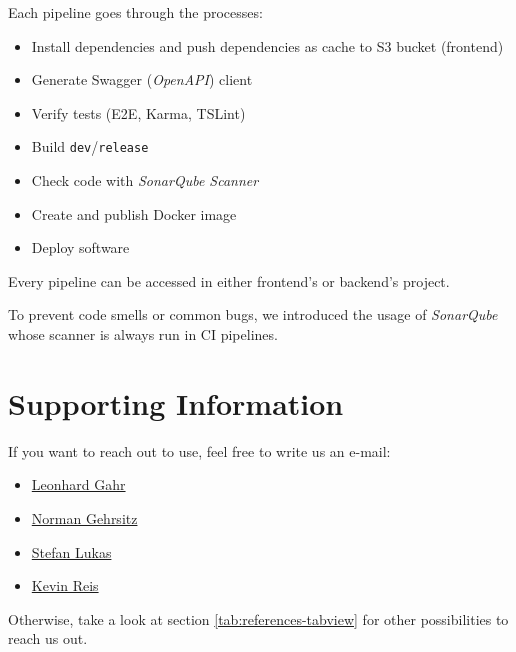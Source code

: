 \documentclass[a4paper,12pt,chapterprefix=false,bibliography=totoc,listof=totoc,]{scrreprt}
\begin{document}
Each pipeline goes through the processes:
\begin{itemize}
	\item Install dependencies and push dependencies as cache to S3 bucket (frontend)
	\item Generate Swagger (\textit{OpenAPI}) client
	\item Verify tests (E2E, Karma, TSLint)
	\item Build \texttt{dev}/\texttt{release}
	\item Check code with \textit{SonarQube Scanner}
	\item Create and publish Docker image
	\item Deploy software
\end{itemize}
Every pipeline can be accessed in either frontend's or backend's project.

To prevent code smells or common bugs, we introduced the usage of \textit{SonarQube} whose scanner is always run in CI pipelines.

\chapter{Supporting Information}
If you want to reach out to use, feel free to write us an e-mail:
\begin{itemize}
	\item \href{mailto:gahr.leonhard@student.dhbw-karlsruhe.de}{Leonhard Gahr}
	\item \href{mailto:gehrsitz.norman@student.dhbw-karlsruhe.de}{Norman Gehrsitz}
	\item \href{mailto:lukas.stefan@student.dhbw-karlsruhe.de}{Stefan Lukas}
	\item \href{mailto:reis.kevin@student.dhbw-karlsruhe.de}{Kevin Reis}
\end{itemize}

Otherwise, take a look at section \ref{tab:references-tabview} for other possibilities to reach us out.
\end{document}
